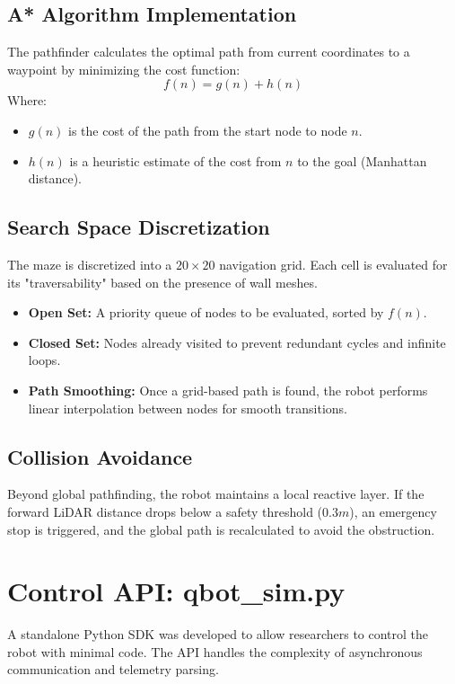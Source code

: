 \documentclass[12pt, a4paper]{article}
\begin{document}
\subsection{A* Algorithm Implementation}
The pathfinder calculates the optimal path from current coordinates to a waypoint by minimizing the cost function:
\begin{equation}
    f(n) = g(n) + h(n)
\end{equation}
Where:
\begin{itemize}
    \item $g(n)$ is the cost of the path from the start node to node $n$.
    \item $h(n)$ is a heuristic estimate of the cost from $n$ to the goal (Manhattan distance).
\end{itemize}

\subsection{Search Space Discretization}
The maze is discretized into a $20 \times 20$ navigation grid. Each cell is evaluated for its "traversability" based on the presence of wall meshes.
\begin{itemize}
    \item \textbf{Open Set:} A priority queue of nodes to be evaluated, sorted by $f(n)$.
    \item \textbf{Closed Set:} Nodes already visited to prevent redundant cycles and infinite loops.
    \item \textbf{Path Smoothing:} Once a grid-based path is found, the robot performs linear interpolation between nodes for smooth transitions.
\end{itemize}

\subsection{Collision Avoidance}
Beyond global pathfinding, the robot maintains a local reactive layer. If the forward LiDAR distance drops below a safety threshold ($0.3m$), an emergency stop is triggered, and the global path is recalculated to avoid the obstruction.

\section{Control API: qbot\_sim.py}
A standalone Python SDK was developed to allow researchers to control the robot with minimal code. The API handles the complexity of asynchronous communication and telemetry parsing.
\end{document}
